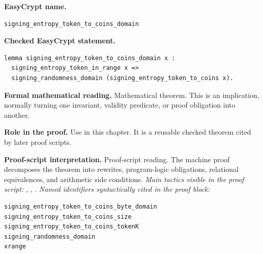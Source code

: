 \begin{formaltheorem}
\noindent\textbf{EasyCrypt name.}
\begin{lstlisting}[language=EasyCrypt,basicstyle=\ttfamily\scriptsize]
signing_entropy_token_to_coins_domain
\end{lstlisting}
\noindent\textbf{Checked EasyCrypt statement.}
\begin{lstlisting}[language=EasyCrypt,basicstyle=\ttfamily\scriptsize]
lemma signing_entropy_token_to_coins_domain x :
  signing_entropy_token_in_range x =>
  signing_randomness_domain (signing_entropy_token_to_coins x).
\end{lstlisting}
\noindent\textbf{Formal mathematical reading.}
Mathematical theorem. This is an implication, normally turning one invariant, validity predicate, or proof obligation into another.

\noindent\textbf{Role in the proof.}
Use in this chapter. It is a reusable checked theorem cited by later proof scripts.

\noindent\textbf{Proof-script interpretation.}
Proof-script reading. The machine proof decomposes the theorem into rewrites, program-logic obligations, relational equivalences, and arithmetic side conditions.
\emph{Main tactics visible in the proof script:} , , .
\emph{Named identifiers syntactically cited in the proof block:}
\begin{lstlisting}[language=EasyCrypt,basicstyle=\ttfamily\scriptsize]
signing_entropy_token_to_coins_byte_domain
signing_entropy_token_to_coins_size
signing_entropy_token_to_coins_tokenK
signing_randomness_domain
xrange
\end{lstlisting}

\end{formaltheorem}

